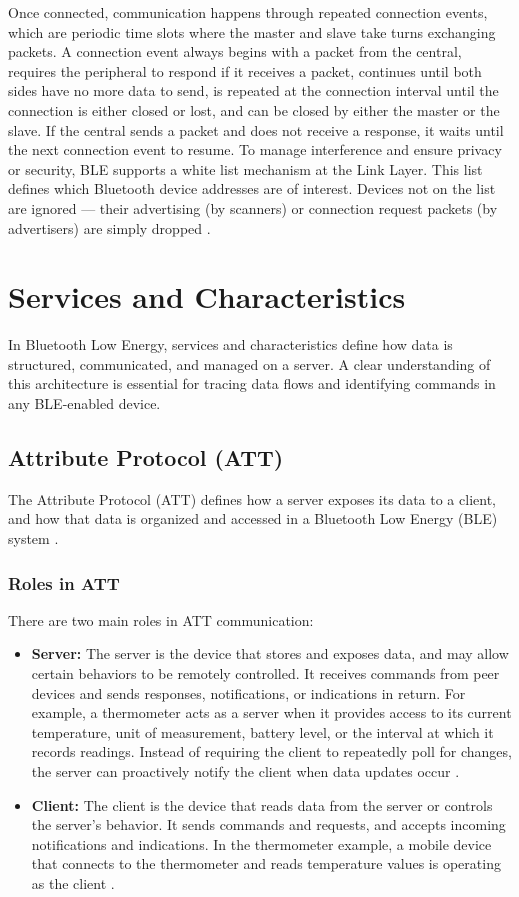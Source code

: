 Once connected, communication happens through repeated connection events, which are periodic time slots where the master and slave take turns exchanging packets. A connection event always begins with a packet from the central, requires the peripheral to respond if it receives a packet, continues until both sides have no more data to send, is repeated at the connection interval until the connection is either closed or lost, and can be closed by either the master or the slave. If the central sends a packet and does not receive a response, it waits until the next connection event to resume.
To manage interference and ensure privacy or security, BLE supports a white list mechanism at the Link Layer. This list defines which Bluetooth device addresses are of interest. Devices not on the list are ignored — their advertising (by scanners) or connection request packets (by advertisers) are simply dropped \cite{gettingstartedwble}.

\section{Services and Characteristics}
In Bluetooth Low Energy, services and characteristics define how data is structured, communicated, and managed on a server. A clear understanding of this architecture is essential for tracing data flows and identifying commands in any BLE-enabled device.

\subsection{Attribute Protocol (ATT)}

The Attribute Protocol (ATT) defines how a server exposes its data to a client, and how that data is organized and accessed in a Bluetooth Low Energy (BLE) system \cite{introtoble}.

\subsubsection{Roles in ATT}

There are two main roles in ATT communication:
\begin{itemize}
    \item \textbf{Server:} The server is the device that stores and exposes data, and may allow certain behaviors to be remotely controlled. It receives commands from peer devices and sends responses, notifications, or indications in return. For example, a thermometer acts as a server when it provides access to its current temperature, unit of measurement, battery level, or the interval at which it records readings. Instead of requiring the client to repeatedly poll for changes, the server can proactively notify the client when data updates occur \cite{introtoble}.
    \item \textbf{Client:} The client is the device that reads data from the server or controls the server's behavior. It sends commands and requests, and accepts incoming notifications and indications. In the thermometer example, a mobile device that connects to the thermometer and reads temperature values is operating as the client \cite{introtoble}.
\end{itemize}

